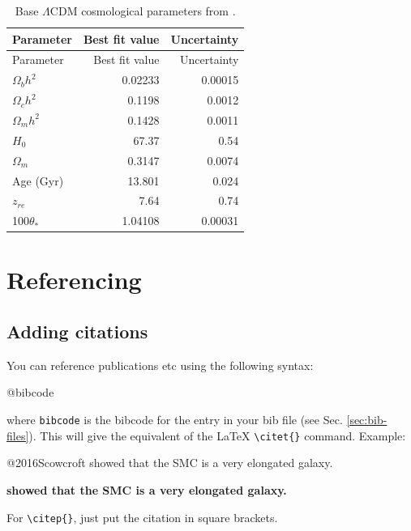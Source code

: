 \documentclass[]{book}
\newenvironment{Shaded}{\begin{snugshade}}{\end{snugshade}}
\newcommand{\NormalTok}[1]{#1}
\begin{document}
\begin{longtable}[]{@{}lrr@{}}
\caption{\label{tab:planck-model} Base \(\Lambda\)CDM cosmological parameters from \citet{Planck18}.}\tabularnewline
\toprule
Parameter & Best fit value & Uncertainty\tabularnewline
\midrule
\endfirsthead
\toprule
Parameter & Best fit value & Uncertainty\tabularnewline
\midrule
\endhead
\(\Omega_{b}h^2\) & 0.02233 & 0.00015\tabularnewline
\(\Omega_{c}h^2\) & 0.1198 & 0.0012\tabularnewline
\(\Omega_{m}h^2\) & 0.1428 & 0.0011\tabularnewline
\(H_0\) & 67.37 & 0.54\tabularnewline
\(\Omega_{m}\) & 0.3147 & 0.0074\tabularnewline
Age (Gyr) & 13.801 & 0.024\tabularnewline
\(z_{re}\) & 7.64 & 0.74\tabularnewline
100\(\theta_{*}\) & 1.04108 & 0.00031\tabularnewline
\bottomrule
\end{longtable}

\hypertarget{sec:referencing}{%
\chapter{Referencing}\label{sec:referencing}}

\hypertarget{sec:add-cite}{%
\section{Adding citations}\label{sec:add-cite}}

You can reference publications etc using the following syntax:

\begin{Shaded}
\begin{Highlighting}[]
\NormalTok{@bibcode }
\end{Highlighting}
\end{Shaded}

where \texttt{bibcode} is the bibcode for the entry in your bib file (see Sec. \ref{sec:bib-files}). This will give the equivalent of the LaTeX \texttt{\textbackslash{}citet\{\}} command.
Example:

\begin{Shaded}
\begin{Highlighting}[]
\NormalTok{@2016Scowcroft showed that the SMC is a very elongated galaxy.}
\end{Highlighting}
\end{Shaded}

\textbf{\citet{2016Scowcroft} showed that the SMC is a very elongated galaxy.}

For \texttt{\textbackslash{}citep\{\}}, just put the citation in square brackets.
\end{document}

